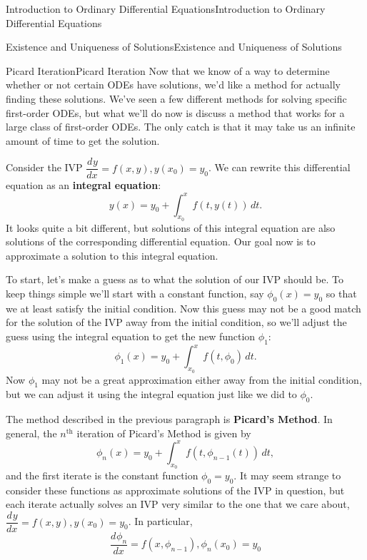\documentclass[10pt,]{book}
\newcommand{\terminology}[1]{\textbf{#1}}
\numberwithin{equation}{section}
\newcommand{\dv}[3][]{\dfrac{d^{#1} #2}{d #3^{#1}}}
\begin{document}
\begin{chapterptx}{Introduction to Ordinary Differential Equations}{}{Introduction to Ordinary Differential Equations}{}{}
\begin{sectionptx}{Existence and Uniqueness of Solutions}{}{Existence and Uniqueness of Solutions}{}{}
\begin{subsectionptx}{Picard Iteration}{}{Picard Iteration}{}{}
\hypertarget{p-100}{}%
Now that we know of a way to determine whether or not certain ODEs have solutions, we'd like a method for actually finding these solutions. We've seen a few different methods for solving specific first-order ODEs, but what we'll do now is discuss a method that works for a large class of first-order ODEs. The only catch is that it may take us an infinite amount of time to get the solution.%
\par
\hypertarget{p-101}{}%
Consider the IVP \(\dv{y}{x} = f(x,y), y(x_{0}) = y_{0}\). We can rewrite this differential equation as an \terminology{integral equation}:%
\begin{equation*}
y(x) = y_{0} + \int_{x_{0}}^{x}f(t,y(t))\,dt.
\end{equation*}
It looks quite a bit different, but solutions of this integral equation are also solutions of the corresponding differential equation. Our goal now is to approximate a solution to this integral equation.%
\par
\hypertarget{p-102}{}%
To start, let's make a guess as to what the solution of our IVP should be. To keep things simple we'll start with a constant function, say \(\phi_{0}(x) = y_{0}\) so that we at least satisfy the initial condition. Now this guess may not be a good match for the solution of the IVP away from the initial condition, so we'll adjust the guess using the integral equation to get the new function \(\phi_{1}\):%
\begin{equation*}
\phi_{1}(x) = y_{0} + \int_{x_{0}}^{x}f(t,\phi_{0})\,dt.
\end{equation*}
Now \(\phi_{1}\) may not be a great approximation either away from the initial condition, but we can adjust it using the integral equation just like we did to \(\phi_{0}\).%
\par
\hypertarget{p-103}{}%
The method described in the previous paragraph is \terminology{Picard's Method}. In general, the \(n^{\text{th}}\) iteration of Picard's Method is given by%
\begin{equation*}
\phi_{n}(x) = y_{0}+\int_{x_{0}}^{x}f(t,\phi_{n-1}(t))\,dt,
\end{equation*}
and the first iterate is the constant function \(\phi_{0} = y_{0}.\) It may seem strange to consider these functions as approximate solutions of the IVP in question, but each iterate actually solves an IVP very similar to the one that we care about, \(\dv{y}{x} = f(x,y), y(x_{0}) = y_{0}\). In particular,%
\begin{equation*}
\dv{\phi_{n}}{x} = f(x,\phi_{n-1}), \phi_{n}(x_{0}) = y_{0}

\end{equation*}
\end{subsectionptx}
\end{sectionptx}
\end{chapterptx}
\end{document}
